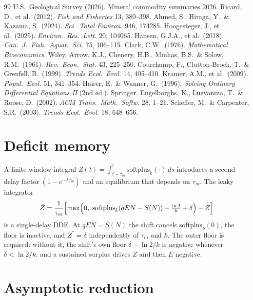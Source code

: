 \documentclass[11pt]{article}
\theoremstyle{definition}
\begin{document}
\begin{thebibliography}{99}
 U.S.\ Geological Survey (2026). Mineral commodity summaries 2026.
 Ricard, D., et al.\ (2012). \textit{Fish and Fisheries} 13, 380--398.
 Ahmed, S., Hiraga, Y.\ \& Kazama, S.\ (2024). \textit{Sci.\ Total Environ.} 946, 174285.
 Hoogesteger, J., et al.\ (2025). \textit{Environ.\ Res.\ Lett.} 20, 104065.
 Hansen, G.J.A., et al.\ (2018). \textit{Can.\ J.\ Fish.\ Aquat.\ Sci.} 75, 106--115.
 Clark, C.W.\ (1976). \textit{Mathematical Bioeconomics}. Wiley.
 Arrow, K.J., Chenery, H.B., Minhas, B.S.\ \& Solow, R.M.\ (1961). \textit{Rev.\ Econ.\ Stat.} 43, 225--250.
 Courchamp, F., Clutton-Brock, T.\ \& Grenfell, B.\ (1999). \textit{Trends Ecol.\ Evol.} 14, 405--410.
 Kramer, A.M., et al.\ (2009). \textit{Popul.\ Ecol.} 51, 341--354.
 Hairer, E.\ \& Wanner, G.\ (1996). \textit{Solving Ordinary Differential Equations II} (2nd ed.). Springer.
 Engelborghs, K., Luzyanina, T.\ \& Roose, D.\ (2002). \textit{ACM Trans.\ Math.\ Softw.} 28, 1--21.
 Scheffer, M.\ \& Carpenter, S.R.\ (2003). \textit{Trends Ecol.\ Evol.} 18, 648--656.
\end{thebibliography}

\appendix
\section{Deficit memory}
\label{app:memory}

A finite-window integral $Z(t)=\int_{t-\tau_m}^t\mathrm{softplus}_k(\cdot)\,ds$ introduces a second delay factor $(1-e^{-\lambda\tau_m})$ and an equilibrium that depends on $\tau_m$. The leaky integrator
\begin{equation}
\dot Z=\frac1{\tau_m}\Bigl[\max\Bigl(0,\;\mathrm{softplus}_k(qEN-S(N))-\tfrac{\ln 2}{k}+\delta\Bigr)-Z\Bigr]
\label{eq:leaky-integrator-A}
\end{equation}
is a single-delay DDE. At $qEN=S(N)$ the shift cancels $\mathrm{softplus}_k(0)$, the floor is inactive, and $Z^*=\delta$ independently of $\tau_m$ and $k$. The outer floor is required: without it, the shift's own floor $\delta-\ln 2/k$ is negative whenever $\delta<\ln 2/k$, and a sustained surplus drives $Z$ and then $E$ negative.

\section{Asymptotic reduction}
\label{app:reduction}
\end{document}
